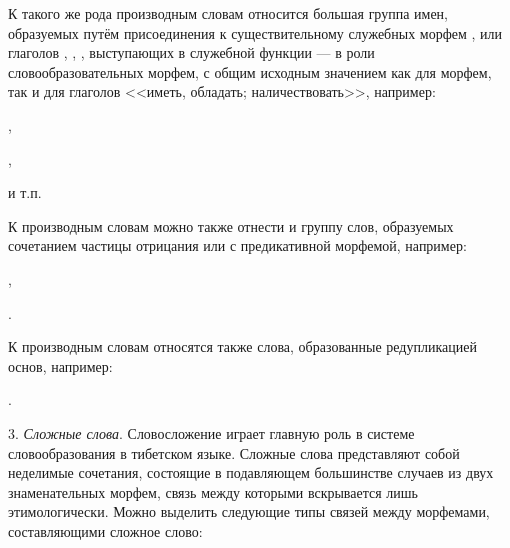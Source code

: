К такого же рода производным словам относится большая группа имен, образуемых путём присоединения к существительному служебных морфем ,  или глаголов , , , выступающих в служебной функции --- в роли словообразовательных морфем, с общим исходным значением как для морфем, так и для глаголов <<иметь, обладать; наличествовать>>, например:
\begin{prfsample}
    \item {},
    \item {},
    \item {}
\end{prfsample}
и т.п.

К производным словам можно также отнести и группу слов, образуемых сочетанием частицы отрицания  или  с предикативной морфемой, например:
\begin{prfsample}
    \item {},
    \item {}.
\end{prfsample}

К производным словам относятся также слова, образованные редупликацией основ, например:
\begin{prfsample}
    \item {}.
\end{prfsample}

3. \emph{Сложные слова}. Словосложение играет главную роль в системе словообразования в тибетском языке. Сложные слова представляют собой неделимые сочетания, состоящие в подавляющем большинстве случаев из двух знаменательных морфем, связь между которыми вскрывается лишь этимологически. Можно выделить следующие типы связей между морфемами, составляющими сложное слово:

